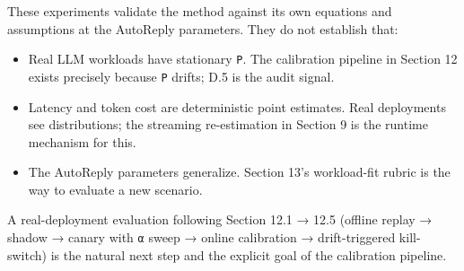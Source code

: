 \documentclass[
  11pt,
]{article}
\providecommand{\tightlist}{%
  \setlength{\itemsep}{0pt}\setlength{\parskip}{0pt}}
\begin{document}
These experiments validate the method against its own equations and
assumptions at the AutoReply parameters. They do not establish that:

\begin{itemize}
\tightlist
\item
  Real LLM workloads have stationary \texttt{P}. The calibration
  pipeline in Section 12 exists precisely because \texttt{P} drifts; D.5
  is the audit signal.
\item
  Latency and token cost are deterministic point estimates. Real
  deployments see distributions; the streaming re-estimation in Section
  9 is the runtime mechanism for this.
\item
  The AutoReply parameters generalize. Section 13's workload-fit rubric
  is the way to evaluate a new scenario.
\end{itemize}

A real-deployment evaluation following Section 12.1 → 12.5 (offline
replay → shadow → canary with \texttt{α} sweep → online calibration →
drift-triggered kill-switch) is the natural next step and the explicit
goal of the calibration pipeline.
\end{document}
